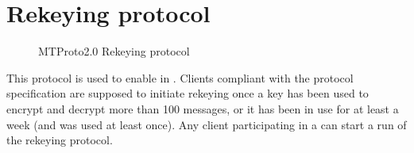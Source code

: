 \section{Rekeying protocol}
\label{sec:rekeying}

\begin{figure}[t]
  \setlength{\instdist}{3.5cm}
  \setmscoptions
  \begin{msc}{}



    \nextlevel[2]

    \nextlevel[6]
    \nextlevel
    \nextlevel


    \nextlevel[6]
    \nextlevel
    \nextlevel


    \nextlevel[4]
    \nextlevel

  \end{msc}

  \centering
  \caption{MTProto2.0 Rekeying protocol}
  \label{fig:rekeying-protocol}
\end{figure}

This protocol is used to enable \pfs{} in \schats{}. Clients compliant with the protocol specification are supposed to initiate rekeying once a \schat{} key has been used to encrypt and decrypt more than 100 messages, or it has been in use for at least a week (and was used at least once). Any client participating in a \schat{} can start a run of the rekeying protocol.

